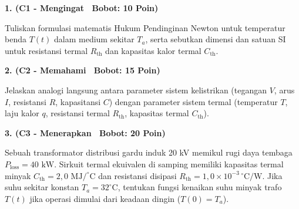\documentclass[10pt,a4paper]{article}
\begin{document}
\par
\vspace{1mm}

\noindent\textbf{1. (C1 - Mengingat \textbar\ Bobot: 10 Poin)}\par\vspace{0.8mm}
{\footnotesize Tuliskan formulasi matematis Hukum Pendinginan Newton untuk temperatur benda $T(t)$ dalam medium sekitar $T_a$, serta sebutkan dimensi dan satuan SI untuk resistansi termal $R_{\text{th}}$ dan kapasitas kalor termal $C_{\text{th}}$.}\par

\vspace{2.5mm}

\noindent\textbf{2. (C2 - Memahami \textbar\ Bobot: 15 Poin)}\par\vspace{0.8mm}
{\footnotesize Jelaskan analogi langsung antara parameter sistem kelistrikan (tegangan $V$, arus $I$, resistansi $R$, kapasitansi $C$) dengan parameter sistem termal (temperatur $T$, laju kalor $q$, resistansi termal $R_{\text{th}}$, kapasitas termal $C_{\text{th}}$).}\par

\vspace{2.5mm}

\noindent\textbf{3. (C3 - Menerapkan \textbar\ Bobot: 20 Poin)}\par\vspace{0.8mm}
\noindent\begin{minipage}[t]{0.60\textwidth}%
  {\footnotesize Sebuah transformator distribusi gardu induk 20 kV memikul rugi daya tembaga $P_{\text{loss}} = 40\text{ kW}$. Sirkuit termal ekuivalen di samping memiliki kapasitas termal minyak $C_{\text{th}} = 2{,}0\text{ MJ/}^\circ\text{C}$ dan resistansi disipasi $R_{\text{th}} = 1{,}0 \times 10^{-3}\,^\circ\text{C/W}$. Jika suhu sekitar konstan $T_a = 32^\circ\text{C}$, tentukan fungsi kenaikan suhu minyak trafo $T(t)$ jika operasi dimulai dari keadaan dingin ($T(0) = T_a$).}%
\end{minipage}%
\hfill%
\begin{minipage}[t]{0.37\textwidth}%
  \centering
\end{minipage}\par
\end{document}
